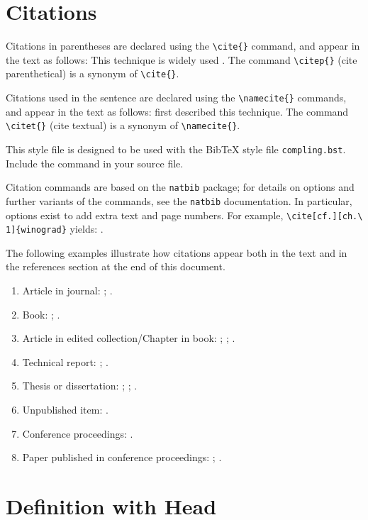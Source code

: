 \documentclass{clv3}
\begin{document}
\section{Citations}
Citations in parentheses are declared using the \verb|\cite{}|
command, and appear in the text as follows: 
This technique is widely used \cite{woods}.
The command \verb|\citep{}| (cite parenthetical) is a synonym of \verb|\cite{}|.

Citations used in the sentence are declared using the \verb|\namecite{}|
commands, and appear in the text as follows: 
 first described this technique.
The command \verb|\citet{}| (cite textual) is a synonym of \verb|\namecite{}|.

This style file is designed to be used with the BibTeX
style file \verb|compling.bst|.  Include the command
\verb|| in your source file.

Citation commands are based on the \verb|natbib| package;
for details on options and further variants of the commands,
see the \verb|natbib| documentation.  In particular, options 
exist to add extra text and page numbers.  For example, 
\verb|\cite[cf.][ch.\ 1]{winograd}| yields: \cite[cf.][ch.\ 1]{winograd}.

The following examples illustrate how citations appear both in the text
and in the references section at the end of this document.
\begin{enumerate}
\item Article in journal: 
 ;
 .
\item Book: 
  ;
  .
\item Article in edited collection/Chapter in book: 
  ;
  ;
  .
\item Technical report:
  ;
  .
\item Thesis or dissertation: 
  ;
  ;
  .
\item Unpublished item: 
  .
\item Conference proceedings: 
  .
\item Paper published in conference proceedings: 
  ;
  .
\end{enumerate}


\section{Definition with Head}
\end{document}

